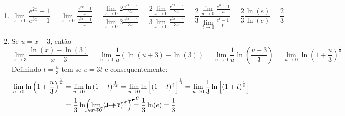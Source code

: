 \documentclass[12pt,a4paper]{article}
\begin{document}
\begin{enumerate}
\begin{enumerate}
\item
\[
    \lim\limits_{x\to 0} \frac{e^{2x}-1}{e^{3x}-1}
  = \lim\limits_{x\to 0} \frac{\frac{e^{2x}-1}{x}}{\frac{e^{3x}-1}{x}}
  = \frac{\lim\limits_{x\to 0} 2\frac{e^{2x}-1}{2x}}
         {\lim\limits_{x\to 0} 3\frac{e^{3x}-1}{3x}}
  = \frac{2\lim\limits_{x\to 0} \frac{e^{2x}-1}{2x}}
         {3\lim\limits_{x\to 0} \frac{e^{3x}-1}{3x}}
  = \frac{2}{3} \frac{\lim\limits_{u\to 0} \frac{e^{u}-1}{u}}
                     {\lim\limits_{t\to 0} \frac{e^{t}-1}{t}}
  = \frac{2}{3} \frac{\ln(e)}
                     {\ln(e)}
  = \frac{2}{3}
\]
\item Se $u = x-3$, então
\[
  \lim\limits_{x\to 3} \frac{\ln(x)-\ln(3)}{x-3}
= \lim\limits_{u\to 0} \frac{1}{u}\left(\ln(u+3)-\ln(3)\right)
= \lim\limits_{u\to 0} \frac{1}{u} \ln\left(\frac{u+3}{3}\right)
= \lim\limits_{u\to 0} \ln\left(1+\frac{u}{3}\right)^{\frac{1}{u}}
\]
Definindo $t=\frac{u}{3}$ tem-se $u=3t$ e consequentemente:
\begin{align*}
  \lim\limits_{u\to 0} \ln\left(1+\frac{u}{3}\right)^{\frac{1}{u}}
& = \lim\limits_{u\to 0} \ln\left(1+t\right)^{\frac{1}{3t}}
  = \lim\limits_{u\to 0} \ln\left[\left(1+t\right)^{\frac{1}{t}}\right]^{\frac{1}{3}}
  = \lim\limits_{u\to 0} \frac{1}{3}\ln\left[\left(1+t\right)^{\frac{1}{t}}\right] \\
& = \frac{1}{3}\ln\cancelto{e}{\left(\lim\limits_{u\to 0} \left(1+t\right)^{\frac{1}{t}}\right)}
  = \frac{1}{3}\ln(e)
  = \frac{1}{3}
\end{align*}
\end{enumerate}
\end{enumerate}
\end{document}
